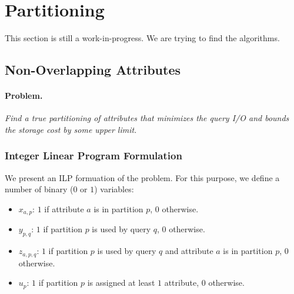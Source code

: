 %
%


\section{Partitioning}
This section is still a work-in-progress. We are trying to find the algorithms.

\subsection{Non-Overlapping Attributes}

\paragraph*{Problem.$\,$} \emph{Find a true partitioning of attributes that
minimizes the query I/O and bounds the storage cost by some upper limit.}

\subsubsection{Integer Linear Program Formulation}\label{subsubsec:nov-ilp}
We present an ILP formuation of the problem. For this purpose, we define a 
number of binary ($0$ or $1$) variables: 
\begin{itemize}
\item $x_{a,p}$: $1$ if attribute $a$ is in partition $p$, $0$ otherwise.
\item $y_{p,q}$: $1$ if partition $p$ is used by query $q$, $0$ otherwise.
\item $z_{a,p,q}$: $1$ if partition $p$ is used by query $q$ and attribute $a$
is in partition $p$, $0$ otherwise.
\item $u_{p}$: $1$ if partition $p$ is assigned at least $1$ attribute, $0$ otherwise.
\end{itemize}

